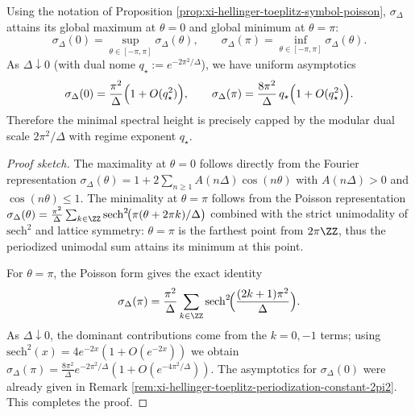 \begin{proposition}\label{prop:xi-hellinger-toeplitz-symbol-extrema-qstar}
Using the notation of Proposition \ref{prop:xi-hellinger-toeplitz-symbol-poisson}, \(\sigma_\Delta\) attains its global maximum at \(\theta=0\) and global minimum at \(\theta=\pi\):
\[
\sigma_\Delta(0)=\sup_{\theta\in[-\pi,\pi]}\sigma_\Delta(\theta),
\qquad
\sigma_\Delta(\pi)=\inf_{\theta\in[-\pi,\pi]}\sigma_\Delta(\theta).
\]
As \(\Delta\downarrow 0\) (with dual nome \(q_\star:=e^{-2\pi^2/\Delta}\)), we have uniform asymptotics
\[
\sigma_\Delta(0)=\frac{\pi^2}{\Delta}\Bigl(1+O(q_\star^{2})\Bigr),
\qquad
\sigma_\Delta(\pi)=\frac{8\pi^2}{\Delta}\,q_\star\Bigl(1+O(q_\star^{2})\Bigr).
\]
Therefore the minimal spectral height is precisely capped by the modular dual scale \(2\pi^2/\Delta\) with regime exponent \(q_\star\).
\end{proposition}
\begin{proof}[Proof sketch]
The maximality at \(\theta=0\) follows directly from the Fourier representation
\(
\sigma_\Delta(\theta)=1+2\sum_{n\ge 1}A(n\Delta)\cos(n\theta)
\)
with \(A(n\Delta)>0\) and \(\cos(n\theta)\le 1\).
The minimality at \(\theta=\pi\) follows from the Poisson representation
\(
\sigma_\Delta(\theta)=\frac{\pi^2}{\Delta}\sum_{k\in\ZZ}\mathrm{sech}^2\!\bigl(\pi(\theta+2\pi k)/\Delta\bigr)
\)
combined with the strict unimodality of \(\mathrm{sech}^2\) and lattice symmetry: \(\theta=\pi\) is the farthest point from \(2\pi\ZZ\), thus the periodized unimodal sum attains its minimum at this point.
\par
For \(\theta=\pi\), the Poisson form gives the exact identity
\[
\sigma_\Delta(\pi)=\frac{\pi^2}{\Delta}\sum_{k\in\ZZ}\mathrm{sech}^2\!\Bigl(\frac{(2k+1)\pi^2}{\Delta}\Bigr).
\]
As \(\Delta\downarrow 0\), the dominant contributions come from the \(k=0,-1\) terms; using
\(
\mathrm{sech}^2(x)=4e^{-2x}(1+O(e^{-2x}))
\)
we obtain
\(
\sigma_\Delta(\pi)=\frac{8\pi^2}{\Delta}e^{-2\pi^2/\Delta}(1+O(e^{-4\pi^2/\Delta}))
\).
The asymptotics for \(\sigma_\Delta(0)\) were already given in Remark \ref{rem:xi-hellinger-toeplitz-periodization-constant-2pi2}. This completes the proof.
\end{proof}


